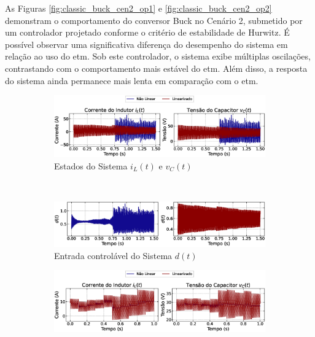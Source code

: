 As Figuras \ref{fig:classic_buck_cen2_op1} e \ref{fig:classic_buck_cen2_op2} demonstram o comportamento do conversor Buck no Cenário 2, submetido por um controlador projetado conforme o critério de estabilidade de Hurwitz. É possível observar uma significativa diferença do desempenho do sistema em relação ao uso do \acrshort{etm}. Sob este controlador, o sistema exibe múltiplas oscilações, contrastando com o comportamento mais estável do \acrshort{etm}. Além disso, a resposta do sistema ainda permanece mais lenta em comparação com o \acrshort{etm}.

\begin{figure}[H]
  \centering
  \captionsetup{justification=centering}
  \begin{subfigure}{1.\textwidth}
    \centering
    \includegraphics[width=1.\textwidth]{figuras/classic/buck/sim2/op1/result.eps}
    \caption{Estados do Sistema $i_L(t)$  e $v_C(t)$}
  \end{subfigure}
  \\[6pt]
  \begin{subfigure}{1.\textwidth}
    \centering
    \includegraphics[width=1.\textwidth]{figuras/classic/buck/sim2/op1/duty-cycle.eps}
    \caption{Entrada controlável do Sistema $d(t)$}
  \end{subfigure}
  \caption{Conversor Buck no Cenário 2 operando em torno de $P_{\mathrm{o}, 1}$ sob controlador projetado utilizando o critério de estabilidade de Hurwitz.}
  \label{fig:classic_buck_cen2_op1}
  \begin{subfigure}{1.\textwidth}
    \centering
    \includegraphics[width=1.\textwidth]{figuras/classic/buck/sim2/op2/result.eps}

\end{subfigure}
\end{figure}
